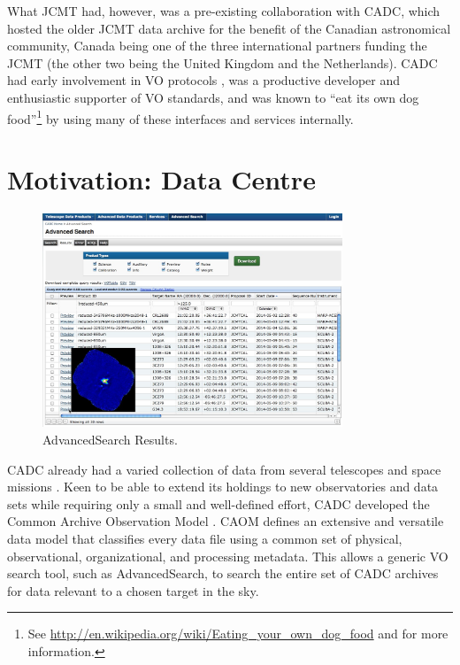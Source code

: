 \documentclass[final,authoryear,5p,times,twocolumn]{elsarticle}
\begin{document}
What JCMT had, however, was a pre-existing collaboration with CADC,
which hosted the older JCMT data archive \citep{1997ASPC..125..397T}
for the benefit of the Canadian astronomical community, Canada being
one of the three international partners funding the JCMT (the other
two being the United Kingdom and the Netherlands). CADC had early
involvement in VO protocols \citep{2002ASPC..281...36S,2015ACCADC}, was a
productive developer and enthusiastic supporter of VO standards, and
was known to ``eat its own dog
food''\footnote{See \url{http://en.wikipedia.org/wiki/Eating_your_own_dog_food} and  \citet{2014arXiv1407.6463E} for more information.}
by using many of these
interfaces and services internally.

\section{Motivation: Data Centre}

\begin{figure}[t]
\begin{center}
\includegraphics[width=0.8\textwidth]{acjsa_fig3}
\caption{AdvancedSearch Results.}
\label{fig:asresults}
\end{center}
\end{figure}

CADC already had a varied collection of data from several
telescopes and space missions
\citep{1994ASPC...61..123C,2008SPIE.7016E..16G}. Keen to be able to
extend its holdings to new observatories and data sets while
requiring only a small and well-defined effort, CADC developed
the Common Archive Observation Model
\citep[CAOM:][]{2007ASPC..376..347D,2008ASPC..394..426D}.  CAOM defines an extensive and
versatile data model that classifies every data file using a common set of physical,
observational, organizational, and processing metadata.
This allows a generic VO search tool, such as AdvancedSearch, to search the
entire set of CADC archives for data relevant to a chosen target in the sky.
\end{document}
